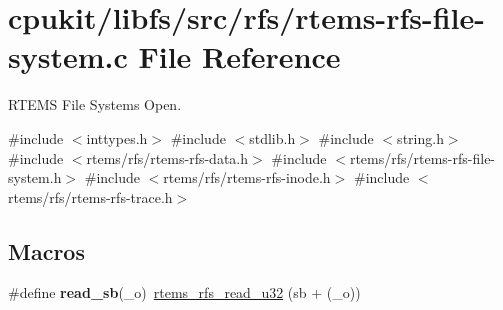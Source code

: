 \hypertarget{rtems-rfs-file-system_8c}{}\section{cpukit/libfs/src/rfs/rtems-\/rfs-\/file-\/system.c File Reference}
\label{rtems-rfs-file-system_8c}


R\+T\+E\+MS File Systems Open.  


{\ttfamily \#include $<$inttypes.\+h$>$}\newline
{\ttfamily \#include $<$stdlib.\+h$>$}\newline
{\ttfamily \#include $<$string.\+h$>$}\newline
{\ttfamily \#include $<$rtems/rfs/rtems-\/rfs-\/data.\+h$>$}\newline
{\ttfamily \#include $<$rtems/rfs/rtems-\/rfs-\/file-\/system.\+h$>$}\newline
{\ttfamily \#include $<$rtems/rfs/rtems-\/rfs-\/inode.\+h$>$}\newline
{\ttfamily \#include $<$rtems/rfs/rtems-\/rfs-\/trace.\+h$>$}\newline
\subsection*{Macros}
\begin{DoxyCompactItemize}
\item 
\mbox{\label{rtems-rfs-file-system_8c_a456b6fc7e0dbd380975ac8d10b4e5014}} 
\#define {\bfseries read\+\_\+sb}(\+\_\+o)~\mbox{\hyperlink{rtems-rfs-data_8h_ae061f1784ebeef490293e0080740041a}{rtems\+\_\+rfs\+\_\+read\+\_\+u32}} (sb + (\+\_\+o))
\end{DoxyCompactItemize}
